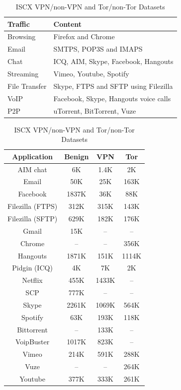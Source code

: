 \begin{table} [ht!]
  \centering
  \begin{tabular}{|p{3cm}|p{8cm}|}
   \hline
   \textbf{Traffic} & \textbf{Content} \\
   \hline
   Browsing & Firefox and Chrome\\
   Email & SMTPS, POP3S and IMAPS\\
   Chat & ICQ, AIM, Skype, Facebook, Hangouts\\
   Streaming & Vimeo, Youtube, Spotify\\
   File Transfer & Skype, FTPS and SFTP using Filezilla\\
   VoIP & Facebook, Skype, Hangouts voice calls\\
   P2P & uTorrent, BitTorrent, Vuze\\
  \hline
  \end{tabular}
  \newline
  \vspace*{0.25 cm}
  \newline
  \begin{tabular}{| c | c | c | c |}
  \hline
   \textbf{Application} & \textbf{Benign} & \textbf{VPN} & \textbf{Tor} \\
   \hline
   AIM chat & 6K & 1.4K & 2K \\
   Email & 50K & 25K & 163K \\
   Facebook & 1837K & 36K & 88K \\
   Filezilla (FTPS) & 312K & 315K & 143K \\
   Filezilla (SFTP) & 629K & 182K & 176K \\
   Gmail & 15K & -- & -- \\
   Chrome & -- & -- & 356K \\
   Hangouts & 1871K & 151K & 1114K \\
   Pidgin (ICQ) & 4K & 7K & 2K \\
   Netflix & 455K & 1433K & -- \\
   SCP & 777K & -- & -- \\
   Skype & 2261K & 1069K & 564K \\
   Spotify & 63K & 193K & 118K \\
   Bittorrent & -- & 133K & -- \\
   VoipBuster & 1017K & 823K & -- \\
   Vimeo & 214K & 591K & 288K \\
   Vuze & -- & -- & 264K \\
   Youtube & 377K & 333K & 261K \\
   \hline
   \end{tabular}
   \caption{ISCX VPN/non-VPN and Tor/non-Tor Datasets}
  \label{tab:iscxvpndetails}
\end{table}

